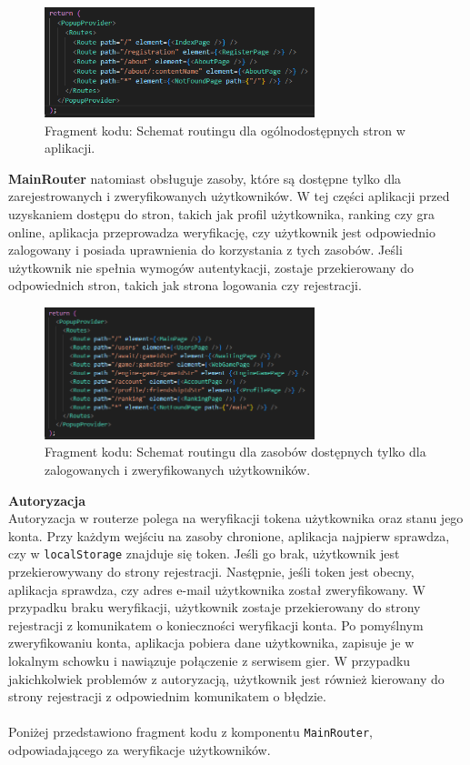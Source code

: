 \documentclass[12pt,a4paper]{article}
\begin{document}
\vspace{0.5cm}
\begin{figure}[h!]
    \centering
    \includegraphics[width=0.7\textwidth]{images/ex_index_router.png}
    \caption{Fragment kodu: Schemat routingu dla ogólnodostępnych stron w aplikacji.}
\end{figure}

\noindent
\textbf{MainRouter} natomiast obsługuje zasoby, które są dostępne tylko dla zarejestrowanych i zweryfikowanych użytkowników. W tej części aplikacji przed uzyskaniem dostępu do stron, takich jak profil użytkownika, ranking czy gra online, aplikacja przeprowadza weryfikację, czy użytkownik jest odpowiednio zalogowany i posiada uprawnienia do korzystania z tych zasobów. Jeśli użytkownik nie spełnia wymogów autentykacji, zostaje przekierowany do odpowiednich stron, takich jak strona logowania czy rejestracji.

\vspace{0.5cm}
\begin{figure}[h!]
    \centering
    \includegraphics[width=0.7\textwidth]{images/ex_main_router.png}
    \caption{Fragment kodu: Schemat routingu dla zasobów dostępnych tylko dla zalogowanych i zweryfikowanych użytkowników.}
\end{figure}

\newpage

\noindent \textbf{Autoryzacja}\\
Autoryzacja w routerze polega na weryfikacji tokena użytkownika oraz stanu jego konta. Przy każdym wejściu na zasoby chronione, aplikacja najpierw sprawdza, czy w \texttt{localStorage} znajduje się token. Jeśli go brak, użytkownik jest przekierowywany do strony rejestracji. Następnie, jeśli token jest obecny, aplikacja sprawdza, czy adres e-mail użytkownika został zweryfikowany. W przypadku braku weryfikacji, użytkownik zostaje przekierowany do strony rejestracji z komunikatem o konieczności weryfikacji konta. Po pomyślnym zweryfikowaniu konta, aplikacja pobiera dane użytkownika, zapisuje je w lokalnym schowku i nawiązuje połączenie z serwisem gier. W przypadku jakichkolwiek problemów z autoryzacją, użytkownik jest również kierowany do strony rejestracji z odpowiednim komunikatem o błędzie.
\\\\
Poniżej przedstawiono fragment kodu z komponentu \texttt{MainRouter}, odpowiadającego za weryfikacje użytkowników.
\end{document}
